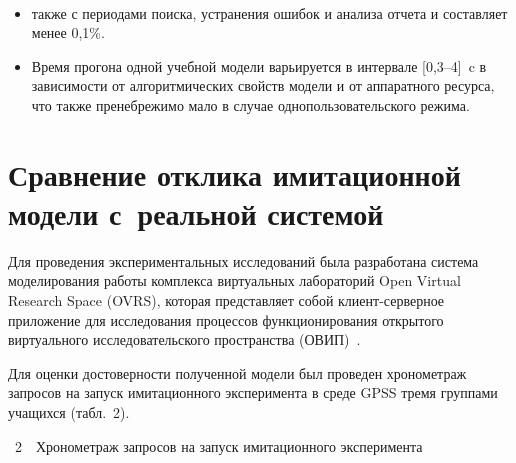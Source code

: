 \begin{figure} %
 \vspace*{1pt}
 \begin{center}
 \mbox{%
 \epsfxsize=163.628mm
 }
 \end{center}
 \vspace*{-9pt}
\end{figure}


\vspace*{-24pt}

\begin{multicols}{2}

\noindent
\begin{itemize}
\item[\ ] также с периодами поиска, устранения ошибок и 
анализа отчета и составляет менее 0,1\%.
\item[2.] Время прогона одной учебной модели варьируется в интервале [0,3--4]~c 
в зависимости от алгоритмических свойств модели и от аппаратного ресурса, 
что также пренебрежимо мало в случае однопользовательского режима. 
  \end{itemize}

\section{Сравнение отклика имитационной модели с~реальной 
системой}
  
  Для проведения экспериментальных исследований была разработана система 
моделирования работы комплекса виртуальных лабораторий Open Virtual 
Research Space ({OVRS}), которая представляет собой кли\-ент-сер\-вер\-ное 
приложение для исследования процессов функционирования открытого 
виртуального исследовательского пространства (ОВИП)~\cite{7zh, 8zh}. 
  
  Для оценки достоверности полученной модели был проведен хронометраж 
запросов на запуск имитационного эксперимента в среде {GPSS} тремя 
группами учащихся (табл.~2). 

\vspace*{12pt}

\noindent
{\small
{{\tablename~2}\ \ \small{Хронометраж запросов на запуск имитационного эксперимента}}


}
\end{multicols}
